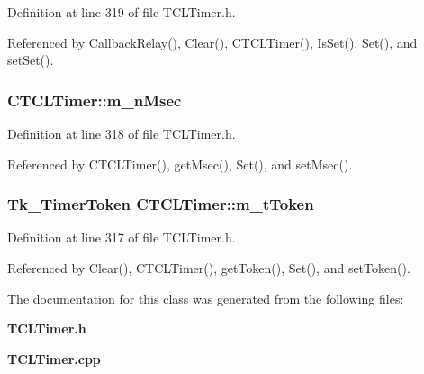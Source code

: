 Definition at line 319 of file TCLTimer.h.

Referenced by Callback\-Relay(), Clear(), CTCLTimer(), Is\-Set(), Set(), and set\-Set().
\subsubsection{ CTCLTimer::m\_\-n\-Msec\hspace{0.3cm}{\tt  [private]}}\label{classCTCLTimer_o1}




Definition at line 318 of file TCLTimer.h.

Referenced by CTCLTimer(), get\-Msec(), Set(), and set\-Msec().
\subsubsection{\setlength{\rightskip}{0pt plus 5cm}Tk\_\-Timer\-Token CTCLTimer::m\_\-t\-Token\hspace{0.3cm}{\tt  [private]}}\label{classCTCLTimer_o0}




Definition at line 317 of file TCLTimer.h.

Referenced by Clear(), CTCLTimer(), get\-Token(), Set(), and set\-Token().

The documentation for this class was generated from the following files:\begin{CompactItemize}
\item 
{\bf TCLTimer.h}\item 
{\bf TCLTimer.cpp}\end{CompactItemize}
